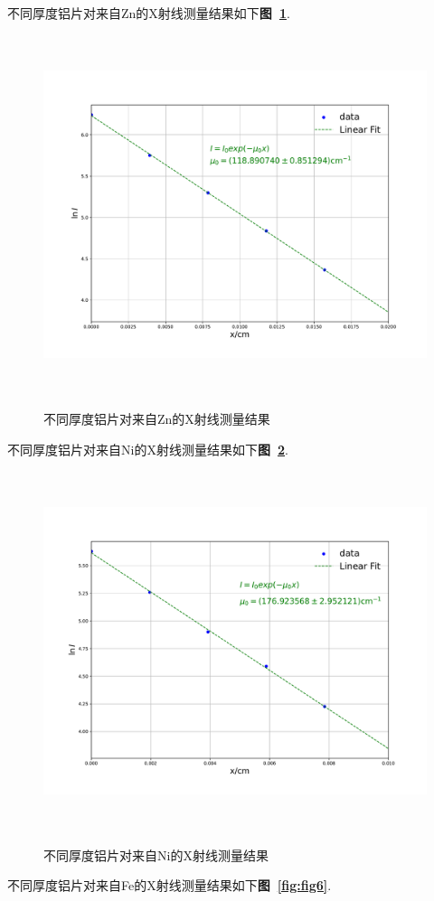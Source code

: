 \documentclass[a4paper]{article}
\begin{document}
不同厚度铝片对来自Zn的X射线测量结果如下\textbf{图~\ref{fig:fig4}}.
\begin{figure}[H]
 \centering
 \caption{不同厚度铝片对来自Zn的X射线测量结果}
 \includegraphics[height=10.5cm, width=14cm]{images/phyex2_fig3.pdf}
 \label{fig:fig4}
\end{figure}
不同厚度铝片对来自Ni的X射线测量结果如下\textbf{图~\ref{fig:fig5}}.
\begin{figure}[H]
 \centering
 \caption{不同厚度铝片对来自Ni的X射线测量结果}
 \includegraphics[height=10.5cm, width=14cm]{images/phyex2_fig4.pdf}
 \label{fig:fig5}
\end{figure}
不同厚度铝片对来自Fe的X射线测量结果如下\textbf{图~\ref{fig:fig6}}.
\end{document}
